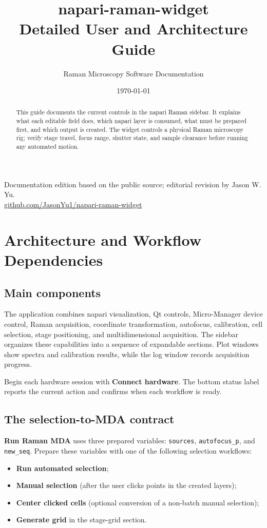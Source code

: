 \documentclass[11pt,oneside]{report}
\title{\textbf{napari-raman-widget}\\\Large Detailed User and Architecture Guide}
\author{Raman Microscopy Software Documentation}
\date{\today}
\newcommand{\ui}[1]{\textbf{#1}}
\newcommand{\code}[1]{\texttt{#1}}
\begin{document}
\maketitle
\thispagestyle{empty}
\begin{abstract}
This guide documents the current controls in the napari Raman sidebar. It explains what each editable field does,
which napari layer is consumed, what must be prepared first, and which output is
created. The widget controls a physical Raman microscopy rig; verify stage travel,
focus range, shutter state, and sample clearance before running any automated motion.
\end{abstract}
\vfill
{\footnotesize
Documentation edition based on the public source; editorial revision by Jason W. Yu.\\
\href{https://github.com/JasonYu1/napari-raman-widget}{github.com/JasonYu1/napari-raman-widget}}
\clearpage
\tableofcontents

\chapter{Architecture and Workflow Dependencies}

\section{Main components}
The application combines napari visualization, Qt controls, Micro-Manager device
control, Raman acquisition, coordinate transformation, autofocus, calibration,
cell selection, stage positioning, and multidimensional acquisition. The sidebar
organizes these capabilities into a sequence of expandable sections. Plot windows
show spectra and calibration results, while the log window records acquisition progress.

Begin each hardware session with \ui{Connect hardware}. The bottom status label
reports the current action and confirms when each workflow is ready.

\section{The selection-to-MDA contract}
\ui{Run Raman MDA} uses three prepared variables: \code{sources},
\code{autofocus\_p}, and \code{new\_seq}. Prepare these variables with one of the
following selection workflows:
\begin{itemize}
  \item \ui{Run automated selection};
  \item \ui{Manual selection} (after the user clicks points in the created layers);
  \item \ui{Center clicked cells} (optional conversion of a non-batch manual selection);
  \item \ui{Generate grid} in the stage-grid section.
\end{itemize}
\end{document}
